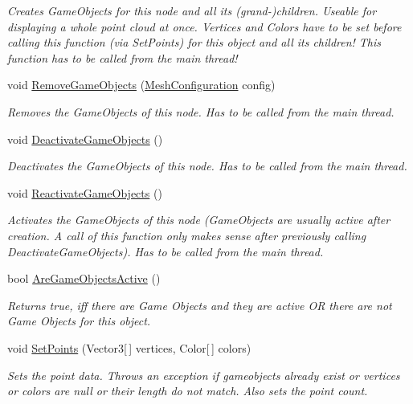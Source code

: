 \begin{DoxyCompactItemize}
\begin{DoxyCompactList}\small\item\em Creates Game\+Objects for this node and all its (grand-\/)children. Useable for displaying a whole point cloud at once. Vertices and Colors have to be set before calling this function (via Set\+Points) for this object and all its children! This function has to be called from the main thread! \end{DoxyCompactList}\item 
void \hyperlink{class_cloud_data_1_1_node_a98647399470b2adc5c6ac27ca78c5ddb}{Remove\+Game\+Objects} (\hyperlink{class_object_creation_1_1_mesh_configuration}{Mesh\+Configuration} config)
\begin{DoxyCompactList}\small\item\em Removes the Game\+Objects of this node. Has to be called from the main thread. \end{DoxyCompactList}\item 
void \hyperlink{class_cloud_data_1_1_node_a397ec14bfc75899441b6edfcabb004ad}{Deactivate\+Game\+Objects} ()
\begin{DoxyCompactList}\small\item\em Deactivates the Game\+Objects of this node. Has to be called from the main thread. \end{DoxyCompactList}\item 
void \hyperlink{class_cloud_data_1_1_node_a8a7c01462a603882108e401c8119e388}{Reactivate\+Game\+Objects} ()
\begin{DoxyCompactList}\small\item\em Activates the Game\+Objects of this node (Game\+Objects are usually active after creation. A call of this function only makes sense after previously calling Deactivate\+Game\+Objects). Has to be called from the main thread. \end{DoxyCompactList}\item 
bool \hyperlink{class_cloud_data_1_1_node_aeb88a03cff66169770082a2e72a9f326}{Are\+Game\+Objects\+Active} ()
\begin{DoxyCompactList}\small\item\em Returns true, iff there are Game Objects and they are active OR there are not Game Objects for this object. \end{DoxyCompactList}\item 
void \hyperlink{class_cloud_data_1_1_node_af82be4d0f143e8894ec6d2ecf4ae8c31}{Set\+Points} (Vector3\mbox{[}$\,$\mbox{]} vertices, Color\mbox{[}$\,$\mbox{]} colors)
\begin{DoxyCompactList}\small\item\em Sets the point data. Throws an exception if gameobjects already exist or vertices or colors are null or their length do not match. Also sets the point count. \end{DoxyCompactList}\item 

\end{DoxyCompactItemize}
